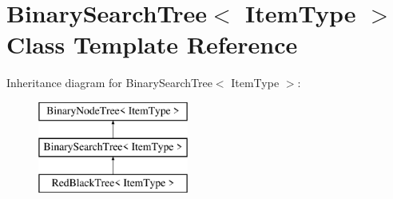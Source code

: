 \hypertarget{class_binary_search_tree}{}\section{Binary\+Search\+Tree$<$ Item\+Type $>$ Class Template Reference}
\label{class_binary_search_tree}
Inheritance diagram for Binary\+Search\+Tree$<$ Item\+Type $>$\+:\begin{figure}[H]
\begin{center}
\leavevmode
\includegraphics[height=3.000000cm]{class_binary_search_tree}
\end{center}
\end{figure}
